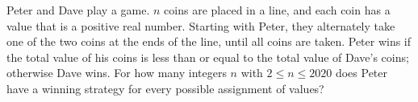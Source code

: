 Peter and Dave play a game. $n$ coins are placed in a line, and each coin has a value that is a positive real number. Starting with Peter, they alternately take one of the two coins at the ends of the line, until all coins are taken. Peter wins if the total value of his coins is less than or equal to the total value of Dave's coins; otherwise Dave wins. For how many integers $n$ with $2\le n\le2020$ does Peter have a winning strategy for every possible assignment of values?
